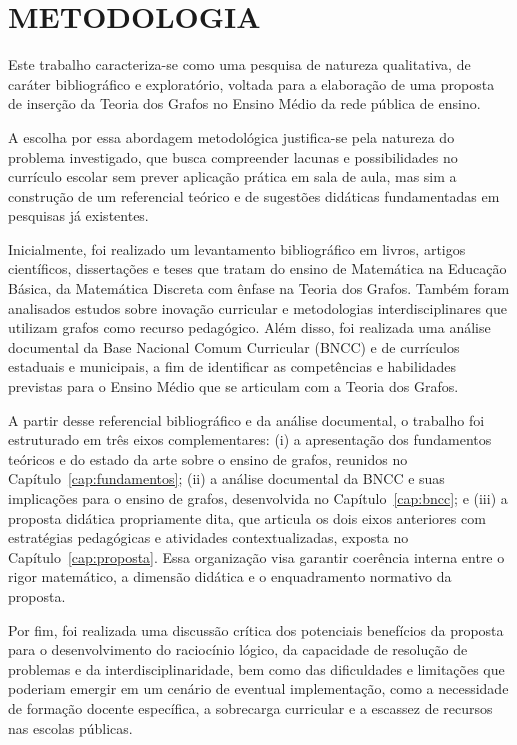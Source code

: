 \documentclass[
  12pt,
  oneside,
  a4paper,
  english,
  brazilian
  ]{abntex2}
\theoremstyle{definition}
\begin{document}
\chapter{METODOLOGIA}

Este trabalho caracteriza-se como uma pesquisa de natureza qualitativa, de
caráter bibliográfico e exploratório, voltada para a elaboração de uma proposta
de inserção da Teoria dos Grafos no Ensino Médio da rede pública de ensino.

A escolha por essa abordagem metodológica justifica-se pela natureza do problema
investigado, que busca compreender lacunas e possibilidades no currículo escolar
sem prever aplicação prática em sala de aula, mas sim a construção de um
referencial teórico e de sugestões didáticas fundamentadas em pesquisas já
existentes.

Inicialmente, foi realizado um levantamento bibliográfico em livros, artigos
científicos, dissertações e teses que tratam do ensino de Matemática na Educação
Básica, da Matemática Discreta com ênfase na Teoria dos Grafos. Também foram
analisados estudos sobre inovação curricular e metodologias interdisciplinares
que utilizam grafos como recurso pedagógico. Além disso, foi realizada uma análise documental da Base Nacional Comum
Curricular (BNCC) e de currículos estaduais e municipais, a fim de identificar as
competências e habilidades previstas para o Ensino Médio que se articulam com a
Teoria dos Grafos.

A partir desse referencial bibliográfico e da análise documental, o trabalho
foi estruturado em três eixos complementares: (i) a apresentação dos
fundamentos teóricos e do estado da arte sobre o ensino de grafos,
reunidos no Capítulo~\ref{cap:fundamentos}; (ii) a análise documental da BNCC
e suas implicações para o ensino de grafos, desenvolvida no
Capítulo~\ref{cap:bncc}; e (iii) a proposta didática propriamente dita, que
articula os dois eixos anteriores com estratégias pedagógicas e atividades
contextualizadas, exposta no Capítulo~\ref{cap:proposta}. Essa organização visa
garantir coerência interna entre o rigor matemático, a dimensão didática e o
enquadramento normativo da proposta.

Por fim, foi realizada uma discussão crítica dos potenciais benefícios da proposta
para o desenvolvimento do raciocínio lógico, da capacidade de resolução de
problemas e da interdisciplinaridade, bem como das dificuldades e limitações que
poderiam emergir em um cenário de eventual implementação, como a necessidade de
formação docente específica, a sobrecarga curricular e a escassez de recursos nas
escolas públicas.
\end{document}
